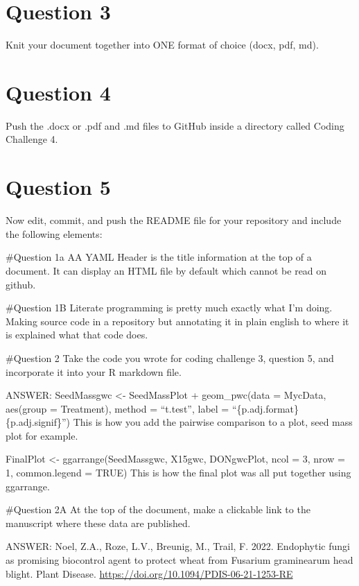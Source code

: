 \documentclass[
]{article}
\begin{document}
\section{Question 3}\label{question-3}

Knit your document together into ONE format of choice (docx, pdf, md).

\section{Question 4}\label{question-4}

Push the .docx or .pdf and .md files to GitHub inside a directory called
Coding Challenge 4.

\section{Question 5}\label{question-5}

Now edit, commit, and push the README file for your repository and
include the following elements:

\#Question 1a AA YAML Header is the title information at the top of a
document. It can display an HTML file by default which cannot be read on
github.

\#Question 1B Literate programming is pretty much exactly what I'm
doing. Making source code in a repository but annotating it in plain
english to where it is explained what that code does.

\#Question 2 Take the code you wrote for coding challenge 3, question 5,
and incorporate it into your R markdown file.

ANSWER: SeedMassgwc \textless- SeedMassPlot + geom\_pwc(data = MycData,
aes(group = Treatment), method = ``t.test'', label =
``\{p.adj.format\}\{p.adj.signif\}'') This is how you add the pairwise
comparison to a plot, seed mass plot for example.

FinalPlot \textless- ggarrange(SeedMassgwc, X15gwc, DONgwcPlot, ncol =
3, nrow = 1, common.legend = TRUE) This is how the final plot was all
put together using ggarrange.

\#Question 2A At the top of the document, make a clickable link to the
manuscript where these data are published.

ANSWER: Noel, Z.A., Roze, L.V., Breunig, M., Trail, F. 2022. Endophytic
fungi as promising biocontrol agent to protect wheat from Fusarium
graminearum head blight. Plant Disease.
\url{https://doi.org/10.1094/PDIS-06-21-1253-RE}
\end{document}
